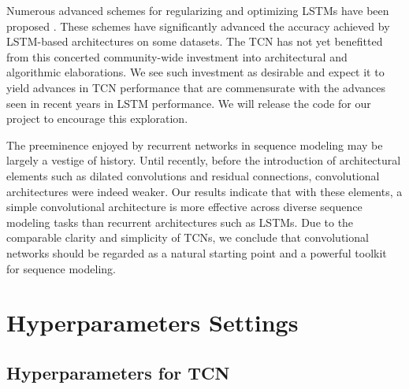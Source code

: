 \documentclass{article}
\begin{document}
Numerous advanced schemes for regularizing and optimizing LSTMs have been proposed \cite{press2016using,kruegerZoneout,merityRegOpt,campos2018skip}. These schemes have significantly advanced the accuracy achieved by LSTM-based architectures on some datasets. The TCN has not yet benefitted from this concerted community-wide investment into architectural and algorithmic elaborations.
We see such investment as desirable and expect it to yield advances in TCN performance that are commensurate with the advances seen in recent years in LSTM performance. We will release the code for our project to encourage this exploration.

The preeminence enjoyed by recurrent networks in sequence modeling may
be largely a vestige of history. Until recently, before the introduction of architectural
elements such as dilated convolutions and residual connections, convolutional
architectures were indeed weaker. Our results indicate that with these elements,
a simple convolutional architecture is more effective across diverse sequence
modeling tasks than recurrent architectures such as LSTMs. Due to the comparable
clarity and simplicity of TCNs, we conclude that convolutional networks should
be regarded as a natural starting point and a powerful toolkit for sequence modeling.



\setlength{\bibsep}{1.25mm}
{\small }



\appendix



\section{Hyperparameters Settings \label{app-params}}

\subsection{Hyperparameters for TCN}
\end{document}
